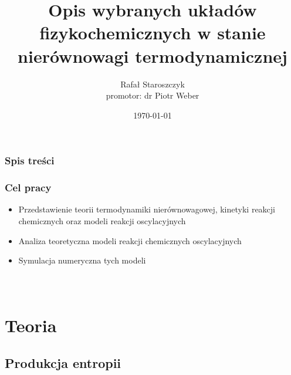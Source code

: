 \documentclass{beamer}
\title{Opis wybranych układów fizykochemicznych w stanie nierównowagi termodynamicznej}
\author{Rafał Staroszczyk\\promotor: dr Piotr Weber}
\institute{Politechnika Gdańska}
\date{\today}
\begin{document}
\beamertemplatenavigationsymbolsempty
{}

\begin{frame}
\titlepage
\end{frame}

\begin{frame}
\frametitle{Spis treści}
\tableofcontents
\end{frame}

\begin{frame}
\frametitle{Cel pracy}
\begin{itemize}
\item Przedstawienie teorii termodynamiki nierównowagowej, kinetyki reakcji chemicznych oraz modeli reakcji oscylacyjnych
\item Analiza teoretyczna modeli reakcji chemicznych oscylacyjnych
\item Symulacja numeryczna tych modeli
\end{itemize}
\end{frame}

\begin{frame}
\begin{columns}

\begin{figure}
\end{figure}
\end{columns}
\end{frame}

\section{Teoria}
\subsection{Produkcja entropii}
\end{document}
